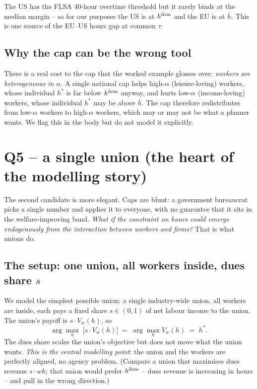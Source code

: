 \documentclass[11pt,a4paper]{article}
\begin{document}
The US has the FLSA 40-hour overtime threshold but it rarely binds at
the median margin -- so for our purposes the US is at $h^{\rm firm}$
and the EU is at $\bar h$. This is one source of the EU--US hours gap
at common $\tau$.

\subsection{Why the cap can be the wrong tool}

There is a real cost to the cap that the worked example glosses over:
\emph{workers are heterogeneous in $\alpha$}. A single national cap
helps high-$\alpha$ (leisure-loving) workers, whose individual $h^\ast$
is far below $h^{\rm firm}$ anyway, and hurts low-$\alpha$
(income-loving) workers, whose individual $h^\ast$ may be above
$\bar h$. The cap therefore redistributes from low-$\alpha$ workers to
high-$\alpha$ workers, which may or may not be what a planner wants. We
flag this in the body but do not model it explicitly.

\section{Q5 -- a single union (the heart of the modelling story)}

The second candidate is more elegant. Caps are blunt: a government
bureaucrat picks a single number and applies it to everyone, with no
guarantee that it sits in the welfare-improving band. \emph{What if
the constraint on hours could emerge endogenously from the interaction
between workers and firms?} That is what unions do.

\subsection{The setup: one union, all workers inside, dues share $s$}

We model the simplest possible union: a single industry-wide union, all
workers are inside, each pays a fixed share $s\!\in\!(0,1)$ of net
labour income to the union. The union's payoff is $s\cdot V_w(h)$, so
\[
\arg\max_h\;\bigl[s\cdot V_w(h)\bigr]\;=\;\arg\max_h V_w(h)\;=\;h^\ast.
\]
The dues share scales the union's objective but does not move what the
union wants. \emph{This is the central modelling point}: the union and
the workers are perfectly aligned, no agency problem. (Compare a union
that maximises dues revenue $s\cdot wh$; that union would prefer
$h^{\rm firm}$ -- dues revenue is increasing in hours -- and pull in
the wrong direction.)
\end{document}
